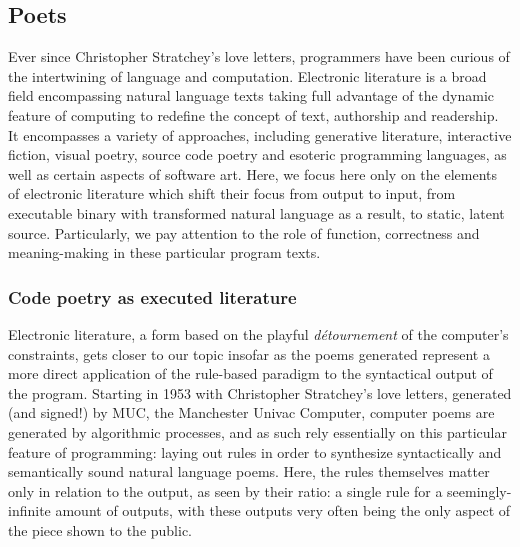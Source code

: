 \subsection{Poets}
\label{subsec:poets}

Ever since Christopher Stratchey's love letters, programmers have been curious of the intertwining of language and computation. Electronic literature is a broad field encompassing natural language texts taking full advantage of the dynamic feature of computing to redefine the concept of text, authorship and readership. It encompasses a variety of approaches, including generative literature, interactive fiction, visual poetry, source code poetry and esoteric programming languages, as well as certain aspects of software art. Here, we focus here only on the elements of electronic literature which shift their focus from output to input, from executable binary with transformed natural language as a result, to static, latent source. Particularly, we pay attention to the role of function, correctness and meaning-making in these particular program texts.

\subsubsection{Code poetry as executed literature}
\label{subsubsec:code-poetry-executed-literature}

Electronic literature, a form based on the playful \emph{détournement} of the computer's constraints, gets closer to our topic insofar as the poems generated represent a more direct application of the rule-based paradigm to the syntactical output of the program. Starting in 1953 with Christopher Stratchey's love letters, generated (and signed!) by MUC, the Manchester Univac Computer, computer poems are generated by algorithmic processes, and as such rely essentially on this particular feature of programming: laying out rules in order to synthesize syntactically and semantically sound natural language poems. Here, the rules themselves matter only in relation to the output, as seen by their ratio: a single rule for a seemingly-infinite amount of outputs, with these outputs very often being the only aspect of the piece shown to the public.

